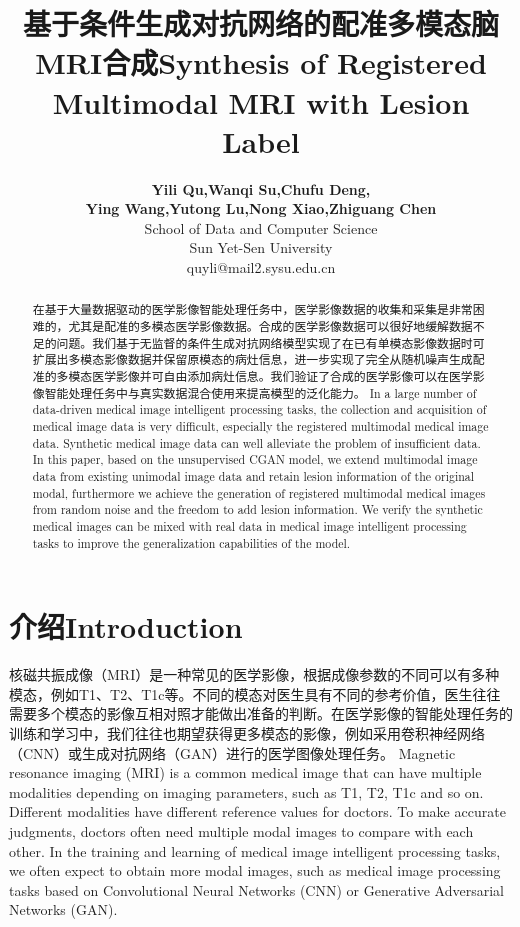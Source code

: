 \documentclass[letterpaper]{article} %
\title{基于条件生成对抗网络的配准多模态脑MRI合成Synthesis of Registered Multimodal MRI with Lesion Label}
\author{\Large \textbf{Yili Qu,Wanqi Su,Chufu Deng,}\\ \Large \textbf{Ying Wang,Yutong Lu,Nong Xiao,Zhiguang Chen}\\ %
School of Data and Computer Science\\ Sun Yet-Sen University\\	
quyli@mail2.sysu.edu.cn%
}
\begin{document}
\maketitle

\begin{abstract}
在基于大量数据驱动的医学影像智能处理任务中，医学影像数据的收集和采集是非常困难的，尤其是配准的多模态医学影像数据。合成的医学影像数据可以很好地缓解数据不足的问题。我们基于无监督的条件生成对抗网络模型实现了在已有单模态影像数据时可扩展出多模态影像数据并保留原模态的病灶信息，进一步实现了完全从随机噪声生成配准的多模态医学影像并可自由添加病灶信息。我们验证了合成的医学影像可以在医学影像智能处理任务中与真实数据混合使用来提高模型的泛化能力。
In a large number of data-driven medical image intelligent processing tasks, the collection and acquisition of medical image data is very difficult, especially the registered multimodal medical image data. Synthetic medical image data can well alleviate the problem of insufficient data. In this paper, based on the unsupervised CGAN model, we extend multimodal image data from existing unimodal image data and retain lesion information of the original modal, furthermore we achieve the generation of registered multimodal medical images from random noise and the freedom to add lesion information. We verify the synthetic medical images can be mixed with real data in medical image intelligent processing tasks to improve the generalization capabilities of the model.
\end{abstract}
\section{介绍Introduction}
 
核磁共振成像（MRI）是一种常见的医学影像，根据成像参数的不同可以有多种模态，例如T1、T2、T1c等。不同的模态对医生具有不同的参考价值，医生往往需要多个模态的影像互相对照才能做出准备的判断。在医学影像的智能处理任务的训练和学习中，我们往往也期望获得更多模态的影像，例如采用卷积神经网络（CNN）\cite{86Krizhevsky2012ImageNet}或生成对抗网络（GAN）\cite{25goodfellow2014generative}进行的医学图像处理任务。
Magnetic resonance imaging (MRI) is a common medical image that can have multiple modalities depending on imaging parameters, such as T1, T2, T1c and so on. Different modalities have different reference values for doctors. To make accurate judgments, doctors often need multiple modal images to compare with each other. In the training and learning of medical image intelligent processing tasks, we often expect to obtain more modal images, such as medical image processing tasks based on Convolutional Neural Networks (CNN)\cite{86Krizhevsky2012ImageNet} or Generative Adversarial Networks (GAN)\cite{25goodfellow2014generative}. 
\end{document}
